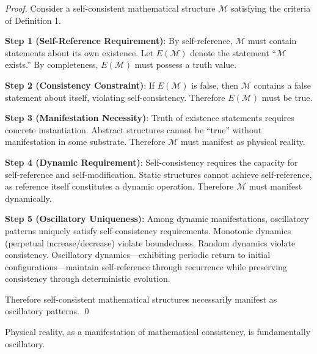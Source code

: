 \begin{proof}
Consider a self-consistent mathematical structure $\mathcal{M}$ satisfying the criteria of Definition 1.

\textbf{Step 1 (Self-Reference Requirement)}: By self-reference, $\mathcal{M}$ must contain statements about its own existence. Let $E(\mathcal{M})$ denote the statement ``$\mathcal{M}$ exists.'' By completeness, $E(\mathcal{M})$ must possess a truth value.

\textbf{Step 2 (Consistency Constraint)}: If $E(\mathcal{M})$ is false, then $\mathcal{M}$ contains a false statement about itself, violating self-consistency. Therefore $E(\mathcal{M})$ must be true.

\textbf{Step 3 (Manifestation Necessity)}: Truth of existence statements requires concrete instantiation. Abstract structures cannot be ``true'' without manifestation in some substrate. Therefore $\mathcal{M}$ must manifest as physical reality.

\textbf{Step 4 (Dynamic Requirement)}: Self-consistency requires the capacity for self-reference and self-modification. Static structures cannot achieve self-reference, as reference itself constitutes a dynamic operation. Therefore $\mathcal{M}$ must manifest dynamically.

\textbf{Step 5 (Oscillatory Uniqueness)}: Among dynamic manifestations, oscillatory patterns uniquely satisfy self-consistency requirements. Monotonic dynamics (perpetual increase/decrease) violate boundedness. Random dynamics violate consistency. Oscillatory dynamics—exhibiting periodic return to initial configurations—maintain self-reference through recurrence while preserving consistency through deterministic evolution.

Therefore self-consistent mathematical structures necessarily manifest as oscillatory patterns. \qed
\end{proof}

\begin{corollary}
Physical reality, as a manifestation of mathematical consistency, is fundamentally oscillatory.
\end{corollary}

